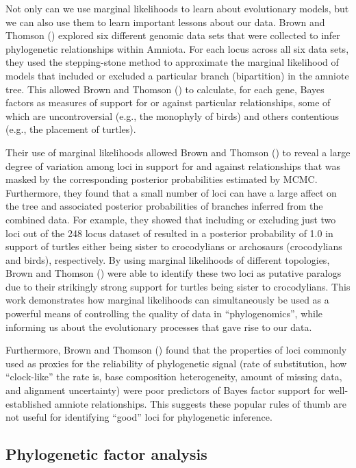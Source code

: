 Not only can we use marginal likelihoods to learn about evolutionary models,
but we can also use them to learn important lessons about our data.
Brown and Thomson (\citeyear{Brown2017}) explored six different genomic data sets
that were collected to infer phylogenetic relationships within Amniota.
For each locus across all six data sets, they used the stepping-stone method
\citep{Xie2011} to approximate the marginal likelihood of models that included
or excluded a particular branch (bipartition) in the amniote tree.
This allowed Brown and Thomson (\citeyear{Brown2017}) to calculate, for each
gene, Bayes factors as measures of support for or against particular
relationships, some of which are uncontroversial (e.g., the monophyly of birds)
and others contentious (e.g., the placement of turtles).

Their use of marginal likelihoods allowed Brown and Thomson
(\citeyear{Brown2017}) to reveal a large degree of variation among loci in
support for and against relationships that was masked by the corresponding
posterior probabilities estimated by MCMC.
Furthermore, they found that a small number of loci can have a large affect on
the tree and associated posterior probabilities of branches inferred from the
combined data.
For example, they showed that including or excluding just two loci out of the
248 locus dataset of \citep{Chiari2012} resulted in a posterior probability of
1.0 in support of turtles either being sister to crocodylians or archosaurs
(crocodylians and birds), respectively.
By using marginal likelihoods of different topologies, Brown and Thomson
(\citeyear{Brown2017}) were able to identify these two loci as putative paralogs
due to their strikingly strong support for turtles being sister to
crocodylians.
This work demonstrates how marginal likelihoods can simultaneously be used as a
powerful means of controlling the quality of data in ``phylogenomics'', while
informing us about the evolutionary processes that gave rise to our data.

Furthermore, Brown and Thomson (\citeyear{Brown2017}) found that the properties
of loci commonly used as proxies for the reliability of phylogenetic signal
(rate of substitution, how ``clock-like'' the rate is, base composition
heterogeneity, amount of missing data, and alignment uncertainty) were poor
predictors of Bayes factor support for well-established amniote relationships.
This suggests these popular rules of thumb are not useful for identifying
``good'' loci for phylogenetic inference.


\subsection{Phylogenetic factor analysis}


